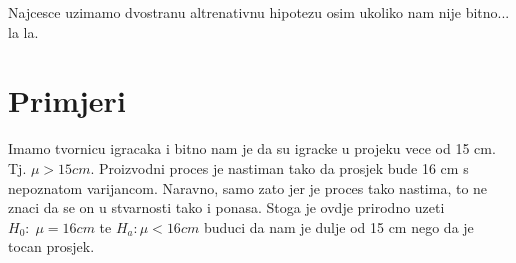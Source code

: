 
Najcesce uzimamo dvostranu altrenativnu hipotezu osim ukoliko nam nije bitno... la la.

\section{Primjeri}
Imamo tvornicu igracaka i bitno nam je da su igracke u projeku vece od 15 cm. Tj. $\mu > 15cm$. Proizvodni proces je nastiman tako da prosjek bude 16 cm s nepoznatom varijancom. Naravno, samo zato jer je proces tako nastima, to ne znaci da se on u stvarnosti tako i ponasa. Stoga je ovdje prirodno uzeti $H_0:\; \mu = 16cm$ te $H_a: \mu < 16cm$ buduci da nam je dulje od 15 cm nego da je tocan prosjek.